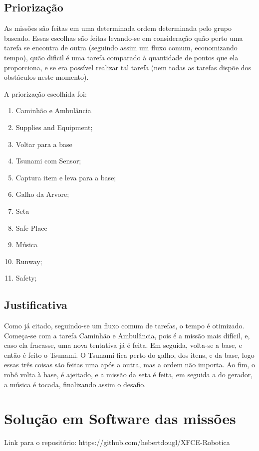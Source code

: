 \section{Priorização}

As missões são feitas em uma determinada ordem determinada pelo grupo baseado. Essas escolhas são feitas levando-se em consideração quão perto uma tarefa se encontra de outra (seguindo assim um fluxo comum, economizando tempo), quão dificil é uma tarefa comparado à quantidade de pontos que ela proporciona, e se era possível realizar tal tarefa (nem todas as tarefas dispõe dos obstáculos neste momento).

A priorização escolhida foi:

\begin{enumerate}
\item Caminhão e Ambulância
\item Supplies and Equipment;
\item Voltar para a base
\item Tsunami com Sensor;
\item Captura item e leva para a base;
\item Galho da Arvore;
\item Seta
\item Safe Place
\item Música
\item Runway;
\item Safety;
\end{enumerate}

\section{Justificativa}
Como já citado, seguindo-se um fluxo comum de tarefas, o tempo é otimizado. Começa-se com a tarefa Caminhão e Ambulância, pois é a missão mais difícil, e, caso ela fracasse, uma nova tentativa já é feita. Em seguida, volta-se a base, e então é feito o Tsunami. O Tsunami fica perto do galho, dos itens, e da base, logo essas três coisas são feitas uma após a outra, mas a ordem não importa. Ao fim, o robô volta à base, é ajeitado, e a missão da seta é feita, em seguida a do gerador, a música é tocada, finalizando assim o desafio.

\chapter{Solução em Software das missões}

Link para o repositório: https://github.com/hebertdougl/XFCE-Robotica

